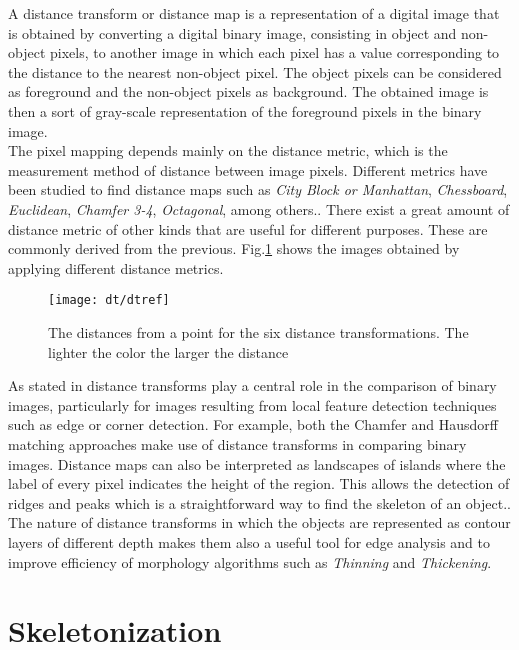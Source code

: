 A distance transform or distance map is a representation of a digital image
that is obtained by converting a digital binary image, consisting in object
and non-object pixels, to another image in which each pixel has a value
corresponding to the distance to the nearest non-object pixel. The object 
pixels can be considered as foreground and the non-object pixels as
background. The obtained image is then a sort of gray-scale representation
of the foreground pixels in the binary image.\\
The pixel mapping depends mainly on the distance metric, which is the 
measurement method of distance between image pixels. Different metrics have been 
studied to find distance maps such as 
\emph{City Block or Manhattan},
\emph{Chessboard}, \emph{Euclidean}, \emph{Chamfer 3-4}, \emph{Octagonal}, among
others.\cite[p.363]{dtresearch}. There exist a great amount of
distance metric of other kinds that are useful for different purposes.
These are commonly derived from the previous.
Fig.\ref{fig:dtexamples} shows the images obtained by applying different distance metrics.

\begin{figure}[h t b p ! H]
 \centering
   \texttt{[image: dt/dtref]}
 \caption{The distances from a point for the six distance transformations.
 The lighter the color the larger the distance \cite[p.365]{dtresearch}}
 \label{fig:dtexamples}
\end{figure}

As stated in \cite{dtresearch2} 
distance transforms play a central role in the comparison of binary images, 
particularly for images resulting from local feature detection techniques such 
as edge or corner detection. For example, both the Chamfer
and Hausdorff matching approaches make use of distance transforms in comparing binary images. 
Distance maps can also be interpreted as landscapes of islands 
where the label of every pixel indicates the height of the region. This allows
the detection of ridges and peaks which is a straightforward way to find the
skeleton of an object.\cite[237]{ridgedt}. The nature of distance transforms
in which the objects are represented as contour layers of different depth
makes them also a useful tool for edge analysis and to improve efficiency of 
morphology algorithms such as \emph{Thinning} and \emph{Thickening}.\\

\section{Skeletonization}
\label{sec:skeletonization}

